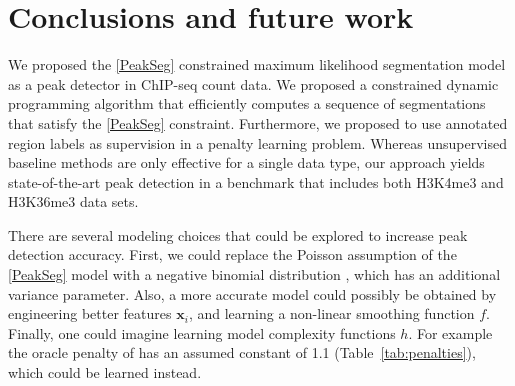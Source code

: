 \documentclass{article}
\begin{document}


\section{Conclusions and future work}
\label{sec:conclusions}

We proposed the \ref{PeakSeg} constrained maximum likelihood
segmentation model as a peak detector in ChIP-seq count data. We
proposed a constrained dynamic programming algorithm that efficiently
computes a sequence of segmentations that satisfy the \ref{PeakSeg}
constraint. Furthermore, we proposed to use annotated region labels as
supervision in a penalty learning problem. Whereas unsupervised
baseline methods are only effective for a single data type, our
approach yields state-of-the-art peak detection in a benchmark that
includes both H3K4me3 and H3K36me3 data sets.

There are several modeling choices that could be explored to increase
peak detection accuracy. First, we could replace the Poisson
assumption of the \ref{PeakSeg} model with a negative binomial
distribution \citep{cleynen2013segmentation}, which has an additional
variance parameter. Also, a more accurate model could possibly be
obtained by engineering better features $\mathbf x_i$, and learning a
non-linear smoothing function $f$. Finally, one could imagine 
learning model complexity functions $h$. For example the oracle
penalty of \citet{cleynen2013segmentation} has an assumed constant of
1.1 (Table~\ref{tab:penalties}), which could be learned instead.
\end{document}
